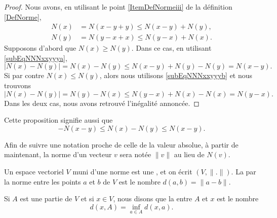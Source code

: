 \begin{proof}
	Nous avons, en utilisant le point \ref{ItemDefNormeiii} de la définition \ref{DefNorme},
	\begin{subequations}
		\begin{align}
			N(x)&=N(x-y+y)\leq N(x-y)+N(y),	\label{subEqNNNxxyyya}\\
			N(y)&=N(y-x+x)\leq N(y-x)+N(x).	\label{subEqNNNxxyyyb}
		\end{align}
	\end{subequations}
	Supposons d'abord que $N(x)\geq N(y)$. Dans ce cas, en utilisant \eqref{subEqNNNxxyyya},
	\begin{equation}
		\big| N(x)-N(y) \big|=N(x)-N(y)\leq N(x-y)+N(y)-N(y)=N(x-y).
	\end{equation}
	Si par contre $N(x)\leq N(y)$, alors nous utilisons \eqref{subEqNNNxxyyyb} et nous trouvons
	\begin{equation}
		\big| N(x)-N(y) \big|=N(y)-N(x)\leq N(y-x)+N(x)-N(x)=N(y-x).
	\end{equation}
	Dans les deux cas, nous avons retrouvé l'inégalité annoncée.
\end{proof}
Cette proposition signifie aussi que
\begin{equation}	\label{EqNleqNNleqNvqlqbs}
	-N(x-y)\leq N(x)-N(y)\leq N(x-y).
\end{equation}


Afin de suivre une notation proche de celle de la valeur absolue, à partir de maintenant, la norme d'un vecteur $v$ sera notée $\| v\|$ au lieu de $N(v)$.
\begin{definition}		\label{DefEVNetDistance}
	Un espace vectoriel $V$ muni d'une norme est une , et on écrit $(V,\| . \|)$. La  par la norme entre les points $a$ et $b$ de $V$ est le nombre $d(a,b)=\| a-b \|$.

	Si $A$ est une partie de $V$ et si $x\in V$, nous disons que la  entre $A$ et $x$ est le nombre
	\begin{equation}		\label{EqdefDistaA}
		d(x,A)=\inf_{a\in A}d(x,a).
	\end{equation}
\end{definition}
\newcommand{\CaptionFigDistanceEnsemble}{La distance entre $x$ et $A$ est donnée par la distance entre $x$ et $p$. Les distances entre $x$ et les autres points de $A$ sont plus grandes que $d(x,p)$.}


